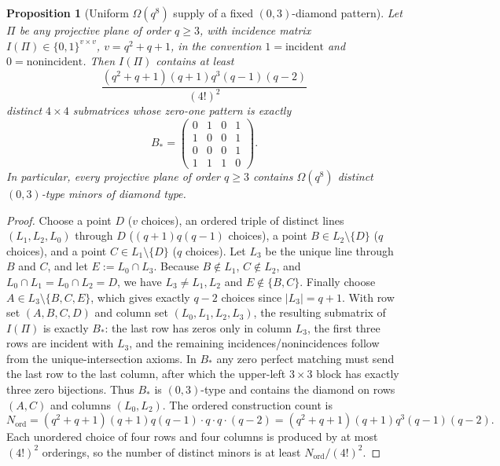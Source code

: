 \documentclass[11pt]{amsart}
\numberwithin{equation}{section}
\theoremstyle{plain}
\newtheorem{proposition}[theorem]{Proposition}
\theoremstyle{definition}
\theoremstyle{remark}
\begin{document}
\begin{proposition}[Uniform $\Omega(q^8)$ supply of a fixed $(0,3)$-diamond pattern]
\label{prop:bstar-abundance}
Let $\Pi$ be any projective plane of order $q\ge 3$, with incidence matrix $I(\Pi)\in\{0,1\}^{v\times v}$,
$v=q^2+q+1$, in the convention $1=\text{incident}$ and $0=\text{nonincident}$. Then $I(\Pi)$ contains at least
\[
\frac{(q^2+q+1)(q+1)q^3(q-1)(q-2)}{(4!)^2}
\]
distinct $4\times4$ submatrices whose zero-one pattern is exactly
\[
B_*=
\begin{pmatrix}
0&1&0&1\\
1&0&0&1\\
0&0&0&1\\
1&1&1&0
\end{pmatrix}.
\]
In particular, every projective plane of order $q\ge 3$ contains $\Omega(q^8)$ distinct $(0,3)$-type minors of diamond type.
\end{proposition}

\begin{proof}
Choose a point $D$ ($v$ choices), an ordered triple of distinct lines $(L_1,L_2,L_0)$ through $D$
($ (q+1)q(q-1)$ choices), a point $B\in L_2\setminus\{D\}$ ($q$ choices), and a point $C\in L_1\setminus\{D\}$ ($q$ choices).
Let $L_3$ be the unique line through $B$ and $C$, and let $E:=L_0\cap L_3$. Because $B\notin L_1$, $C\notin L_2$, and
$L_0\cap L_1=L_0\cap L_2=D$, we have $L_3\neq L_1,L_2$ and $E\notin\{B,C\}$. Finally choose
$A\in L_3\setminus\{B,C,E\}$, which gives exactly $q-2$ choices since $|L_3|=q+1$.
With row set $(A,B,C,D)$ and column set $(L_0,L_1,L_2,L_3)$, the resulting submatrix of $I(\Pi)$ is exactly $B_*$: the last row has
zeros only in column $L_3$, the first three rows are incident with $L_3$, and the remaining incidences/nonincidences follow from the
unique-intersection axioms. In $B_*$ any zero perfect matching must send the last row to the last column, after which the upper-left
$3\times3$ block has exactly three zero bijections. Thus $B_*$ is $(0,3)$-type and contains the diamond on rows $(A,C)$ and columns
$(L_0,L_2)$. The ordered construction count is
\[
N_{\mathrm{ord}}=(q^2+q+1)(q+1)q(q-1)\cdot q\cdot q\cdot(q-2)
=(q^2+q+1)(q+1)q^3(q-1)(q-2).
\]
Each unordered choice of four rows and four columns is produced by at most $(4!)^2$ orderings, so the number of distinct minors is at
least $N_{\mathrm{ord}}/(4!)^2$.
\end{proof}
\end{document}
